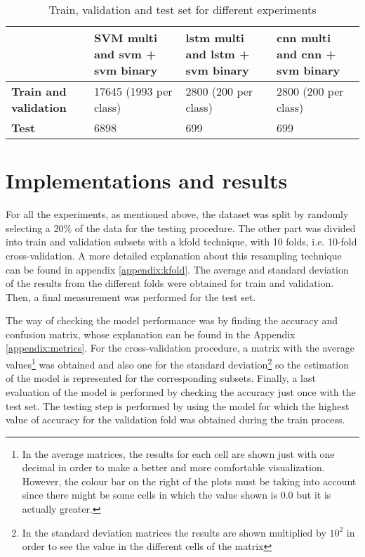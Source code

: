 	
	\begin{table}[ht]
		\centering
		\begin{tabular}{|| m{5em} | m{9em} | m{9em} | m{9em} ||}
			\hline
			& \textbf{SVM multi and \acrshort{svm} + \acrshort{svm} binary} & \textbf{\acrshort{lstm} multi and \acrshort{lstm} + \acrshort{svm} binary} & \textbf{\acrshort{cnn} multi and \acrshort{cnn} + \acrshort{svm} binary}  \\
			\hline\hline
			\textbf{Train and validation} & 17645 (1993 per class) & 2800 (200 per class) & 2800 (200 per class) \\
			\hline
			\textbf{Test} & 6898 & 699 & 699 \\
			\hline                    
		\end{tabular}
		\caption{Train, validation and test set for different experiments}
		\label{table:8}
	\end{table}

\section{Implementations and results}

	For all the experiments, as mentioned above, the dataset was split by randomly selecting a 20\% of the data for the testing procedure. The other part was divided into train and validation subsets with a \acrlong{kfold} technique, with 10 folds, i.e. 10-fold cross-validation. A more detailed explanation about this resampling technique can be found in appendix \ref{appendix:kfold}. The average and standard deviation of the results from the different folds were obtained for train and validation. Then, a final measurement was performed for the test set. 
	
	The way of checking the model performance was by finding the accuracy and confusion matrix, whose explanation can be found in the Appendix \ref{appendix:metrics}. For the cross-validation procedure, a matrix with the average values\footnote{In the average matrices, the results for each cell are shown just with one decimal in order to make a better and more comfortable visualization. However, the colour bar on the right of the plots must be taking into account since there might be some cells in which the value shown is $0.0$ but it is actually greater.} was obtained and also one for the standard deviation\footnote{In the standard deviation matrices the results are shown multiplied by $10^{2}$ in order to see the value in the different cells of the matrix} so the estimation of the model is represented for the corresponding subsets. Finally, a last evaluation of the model is performed by checking the accuracy just once with the test set. The testing step is performed by using the model for which the highest value of accuracy for the validation fold was obtained during the train process.
	
